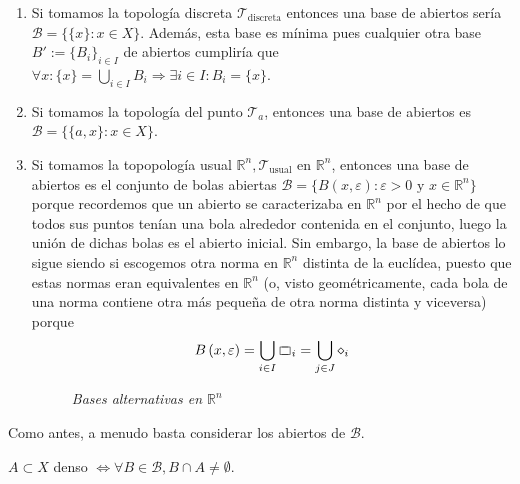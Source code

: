 \begin{ej}
\begin{enumerate}
    \item Si tomamos la topología discreta $\mathcal{T}_{\text{discreta}}$ entonces una base de abiertos sería $\mathcal{B} = \{\{x\} : x \in X\}$. Además, esta base es mínima pues cualquier otra base $B' := \{B_i\}_{i\in I}$ de abiertos cumpliría que $\forall x  : \{x\} = \bigcup_{i \in  I} B_i \Rightarrow \exists i \in I : B_i = \{x\}$.
    \item Si tomamos la topología del punto $\mathcal{T}_a$, entonces una base de abiertos es $\mathcal{B} = \{\{a, x\} : x \in X\}$.
    \item Si tomamos la topopología usual $\mathbb{R}^n, \mathcal{T}_{\text{usual}}$ en $\mathbb{R}^n$, entonces una base de abiertos es el conjunto de bolas abiertas $\mathcal{B} = \{B\left( x, \varepsilon \right) : \varepsilon > 0 \mbox{ y } x \in \mathbb{R}^n\}$ porque recordemos que un abierto se caracterizaba en $\mathbb{R}^n$ por el hecho de que todos sus puntos tenían una bola alrededor contenida en el conjunto, luego la unión de dichas bolas es el abierto inicial.
    Sin embargo, la base de abiertos lo sigue siendo si escogemos otra norma en $\mathbb{R}^n$ distinta de la euclídea, puesto que estas normas eran equivalentes en $\mathbb{R}^n$ (o, visto geométricamente, cada bola de una norma contiene otra más pequeña de otra norma distinta y viceversa)
    porque
    \[
    B\left( x, \varepsilon \right) = \bigcup_{i \in  I} \ooalign{$\sqsubset\mkern3mu$\cr$\mkern3mu\sqsupset$\cr}_i = \bigcup_{j \in J} \diamond_i
    \]
\begin{figure}[H]
    \centering
    \caption{\textit{Bases alternativas en $\mathbb{R}^n$}}
    \label{fig:bases-alternativas-en-rn}
\end{figure}
\end{enumerate}
\end{ej}

\begin{pg}
    Como antes, a menudo basta considerar los abiertos de $\mathcal{B}$. 
\end{pg}

\begin{il}
$A \subset X$ denso $\Leftrightarrow \forall B \in \mathcal{B}, B \cap A \neq \emptyset$.
\end{il}

